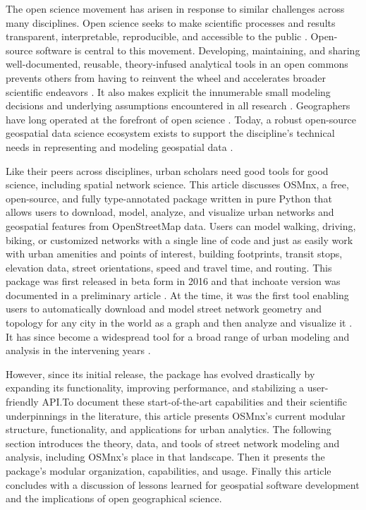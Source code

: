 \documentclass[12pt,letterpaper]{article} %
\begin{document}
The open science movement has arisen in response to similar challenges across many disciplines. Open science seeks to make scientific processes and results transparent, interpretable, reproducible, and accessible to the public \citep{kedron_reproducibility_2021}. Open-source software is central to this movement. Developing, maintaining, and sharing well-documented, reusable, theory-infused analytical tools in an open commons prevents others from having to reinvent the wheel and accelerates broader scientific endeavors \citep{singleton_establishing_2016}. It also makes explicit the innumerable small modeling decisions and underlying assumptions encountered in all research \citep{gahegan_our_2018,rey_pysal_2022}. Geographers have long operated at the forefront of open science \citep{rey_show_2009,harris_more_2017}. Today, a robust open-source geospatial data science ecosystem exists to support the discipline's technical needs in representing and modeling geospatial data \citep{fleischmann_momepy_2019,rey_pysal:_2019,van_den_bossche_geopandasgeopandas_2024}.

Like their peers across disciplines, urban scholars need good tools for good science, including spatial network science. This article discusses OSMnx, a free, open-source, and fully type-annotated package written in pure Python that allows users to download, model, analyze, and visualize urban networks and geospatial features from OpenStreetMap data. Users can model walking, driving, biking, or customized networks with a single line of code and just as easily work with urban amenities and points of interest, building footprints, transit stops, elevation data, street orientations, speed and travel time, and routing. This package was first released in beta form in 2016 and that inchoate version was documented in a preliminary article \citep{boeing_osmnx:_2017}. At the time, it was the first tool enabling users to automatically download and model street network geometry and topology for any city in the world as a graph and then analyze and visualize it \citep{boeing_right_2020}. It has since become a widespread tool for a broad range of urban modeling and analysis in the intervening years \citep[e.g.,][]{coutrot_entropy_2022,dacci_signature_2019,feng_spatial_2020,gervasoni_calculating_2017,liao_disparities_2020,natera_orozco_data-driven_2020,yin_multi-task_2020,young_automatic_2020}.

However, since its initial release, the package has evolved drastically by expanding its functionality, improving performance, and stabilizing a user-friendly API.\@ To document these start-of-the-art capabilities and their scientific underpinnings in the literature, this article presents OSMnx's current modular structure, functionality, and applications for urban analytics. The following section introduces the theory, data, and tools of street network modeling and analysis, including OSMnx's place in that landscape. Then it presents the package's modular organization, capabilities, and usage. Finally this article concludes with a discussion of lessons learned for geospatial software development and the implications of open geographical science.
\end{document}
